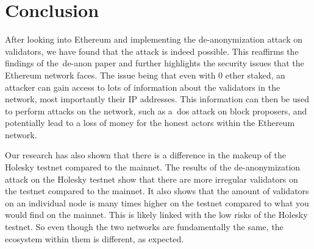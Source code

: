 

\section{Conclusion}\label{sec:conclusion}
After looking into Ethereum and implementing the de-anonymization attack on validators, we have found that the attack is indeed possible.
This reaffirms the findings of the~\gls{de-anon paper} and further highlights the security issues that the Ethereum network faces.
The issue being that even with 0 ether staked, an attacker can gain access to lots of information about the validators in the network, most importantly their IP addresses.
This information can then be used to perform attacks on the network, such as a~\gls{dos} attack on block proposers, and potentially lead to a loss of money for the honest actors within the Ethereum network.


Our research has also shown that there is a difference in the makeup of the Holesky testnet compared to the mainnet.
The results of the de-anonymization attack on the Holesky testnet show that there are more irregular validators on the testnet compared to the mainnet.
It also shows that the amount of validators on an individual node is many times higher on the testnet compared to what you would find on the mainnet. This is likely linked with the low risks of the Holesky testnet.
So even though the two networks are fundamentally the same, the ecosystem within them is different, as expected.